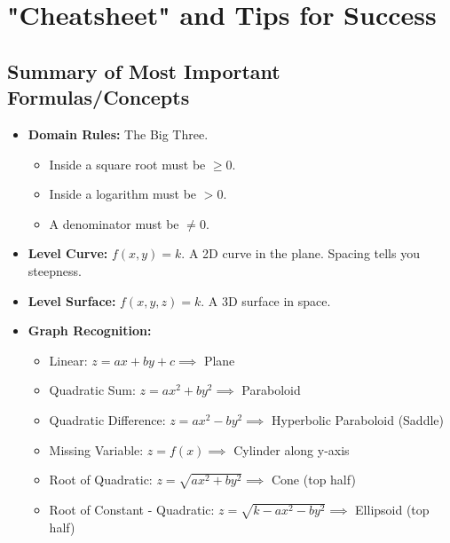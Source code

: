 \documentclass{article}
\begin{document}
\section{"Cheatsheet" and Tips for Success}

\subsection{Summary of Most Important Formulas/Concepts}
\begin{itemize}
    \item \textbf{Domain Rules:} The Big Three.
    \begin{itemize}
        \item Inside a square root must be $\ge 0$.
        \item Inside a logarithm must be $> 0$.
        \item A denominator must be $\neq 0$.
    \end{itemize}
    \item \textbf{Level Curve:} $f(x, y) = k$. A 2D curve in the plane. Spacing tells you steepness.
    \item \textbf{Level Surface:} $f(x, y, z) = k$. A 3D surface in space.
    \item \textbf{Graph Recognition:}
    \begin{itemize}
        \item Linear: $z = ax+by+c \implies$ Plane
        \item Quadratic Sum: $z = ax^2 + by^2 \implies$ Paraboloid
        \item Quadratic Difference: $z = ax^2 - by^2 \implies$ Hyperbolic Paraboloid (Saddle)
        \item Missing Variable: $z = f(x) \implies$ Cylinder along y-axis
        \item Root of Quadratic: $z = \sqrt{ax^2+by^2} \implies$ Cone (top half)
        \item Root of Constant - Quadratic: $z = \sqrt{k - ax^2 - by^2} \implies$ Ellipsoid (top half)
    \end{itemize}
\end{itemize}
\end{document}
